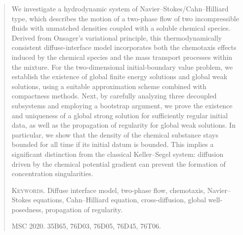 \documentclass[11pt,reqno]{amsart}
\begin{document}
\begin{abstract}
We investigate a hydrodynamic system of Navier--Stokes/Cahn--Hilliard type, which describes the motion of a two-phase flow of two incompressible fluids with unmatched densities coupled with a soluble chemical species. Derived from Onsager's variational principle, this thermodynamically consistent diffuse-interface model incorporates both the chemotaxis effects induced by the chemical species and the mass transport processes within the mixture. For the two-dimensional initial-boundary value problem, we establish the existence of global finite energy solutions and global weak solutions, using a suitable approximation scheme combined with compactness methods. Next, by carefully analyzing three decoupled subsystems and employing a bootstrap argument, we prove the existence and uniqueness of a global strong solution for sufficiently regular initial data, as well as the propagation of regularity for global weak solutions. In particular, we show that the density of the chemical substance stays bounded for all time if its initial datum is bounded. This implies a significant distinction from the classical Keller--Segel system: diffusion driven by the chemical potential gradient can prevent the formation of concentration singularities.
\smallskip

\noindent \textsc{Keywords.}
Diffuse interface model, two-phase flow, chemotaxis, Navier--Stokes equations, Cahn--Hilliard equation, cross-diffusion, global well-posedness, propagation of regularity.
\smallskip

\noindent \textsc{MSC 2020.}
35B65, 76D03, 76D05, 76D45, 76T06.
\end{abstract}
%
%
%
\date{\today}
%
\maketitle
%
\tableofcontents

\end{document}
